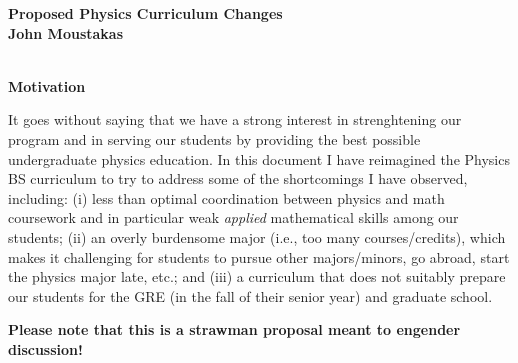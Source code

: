 \documentclass[12pt,preprint]{aastex}
\begin{document}
\vspace*{-1.2in} 
\begin{center}
{\Large {\bf\sc Proposed Physics Curriculum Changes}} \\
\vspace*{2mm} 
{\bf\sc John Moustakas} \\
\vspace*{2mm} 
 \\
\vspace*{0.1in} 
\end{center}

{\large \sc \textbf{Motivation}}
\vspace{-1mm}


It goes without saying that we have a strong interest in strenghtening our
program and in serving our students by providing the best possible undergraduate
physics education.  In this document I have reimagined the Physics BS curriculum
to try to address some of the shortcomings I have observed, including: (i) less
than optimal coordination between physics and math coursework and in particular
weak \emph{applied} mathematical skills among our students; (ii) an overly
burdensome major (i.e., too many courses/credits), which makes it challenging
for students to pursue other majors/minors, go abroad, start the physics major
late, etc.; and (iii) a curriculum that does not suitably prepare our students
for the GRE (in the fall of their senior year) and graduate school.  


{\bf Please note that this is a strawman proposal meant to engender discussion!}  


\end{document}
